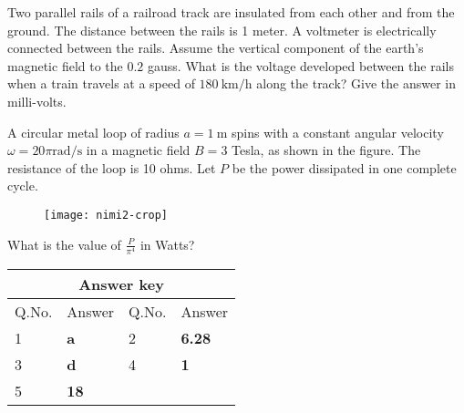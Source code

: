 \begin{enumerate}
\begin{minipage}{\textwidth}
	\item Two parallel rails of a railroad track are insulated from each other and from the ground. The distance between the rails is 1 meter. A voltmeter is electrically connected between the rails. Assume the vertical component of the earth's magnetic field to the $0.2$ gauss. What is the voltage developed between the rails when a train travels at a speed of $180 \mathrm{~km} / \mathrm{h}$ along the track? Give the answer in milli-volts.
\end{minipage}
\begin{minipage}{\textwidth}
	\item A circular metal loop of radius $a=1 \mathrm{~m}$ spins with a constant angular velocity $\omega=20 \pi \mathrm{rad} / \mathrm{s}$ in a magnetic field $B=3$ Tesla, as shown in the figure. The resistance of the loop is 10 ohms. Let $P$ be the power dissipated in one complete cycle.
\begin{figure}[H]
	\centering
	\texttt{[image: nimi2-crop]}
\end{figure}
	 What is the value of $\frac{P}{\pi^{4}}$ in Watts?
\end{minipage}
\end{enumerate}
\setlength\arrayrulewidth{1pt}
\begin{table}[H]
	\centering
	
	\begin{tabular}{|p{1.5cm}|p{1.5cm}||p{1.5cm}|p{1.5cm}|}
		\hline
		\multicolumn{4}{|c|}{\textbf{Answer key}}\\\hline\hline
		\rowcolor{ocrel}Q.No.&Answer&Q.No.&Answer\\\hline
		1&\textbf{a}&2&\textbf{6.28}\\\hline
		3&\textbf{d}&4&\textbf{1}\\\hline
		5&\textbf{18}&&\\\hline
	\end{tabular}
\end{table}















